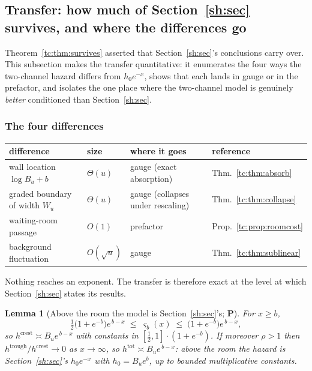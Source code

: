 \documentclass[11pt]{article}
\numberwithin{equation}{section}
\theoremstyle{plain}
\newtheorem{lemma}[theorem]{Lemma}
\theoremstyle{definition}
\theoremstyle{remark}
\begin{document}
\subsection{Transfer: how much of Section~\ref{sh:sec} survives, and where the
differences go}\label{tc:sub:transfer}

Theorem~\ref{tc:thm:survives} asserted that Section~\ref{sh:sec}'s conclusions
carry over. This subsection makes the transfer quantitative: it
enumerates the four ways the two-channel hazard differs from
$h_{0}e^{-x}$, shows that each lands in gauge or in the prefactor, and
isolates the one place where the two-channel model is genuinely
\emph{better} conditioned than Section~\ref{sh:sec}.

\subsubsection{The four differences}\label{tc:subsub:four}

\begin{center}\small
\begin{tabular}{@{}llll@{}}
\toprule
difference & size & where it goes & reference\\
\midrule
wall location $\log B_u+b$ & $\Theta(u)$ & gauge (exact absorption) &
Thm.~\ref{tc:thm:absorb}\\
graded boundary of width $W_u$ & $\Theta(u)$ & gauge (collapses under
rescaling) & Thm.~\ref{tc:thm:collapse}\\
waiting-room passage & $O(1)$ & prefactor & Prop.~\ref{tc:prop:roomcost}\\
background fluctuation & $O(\sqrt u)$ & gauge &
Thm.~\ref{tc:thm:sublinear}\\
\bottomrule
\end{tabular}
\end{center}

\noindent Nothing reaches an exponent. The transfer is therefore exact
at the level at which Section~\ref{sh:sec} states its results.

\begin{lemma}[Above the room the model is Section~\ref{sh:sec}'s; \textbf{P}]
\label{tc:lem:aboveroom}
For $x\ge b$,
\begin{equation}\label{tc:eq:sandwich}
\tfrac12\bigl(1+e^{-b}\bigr)e^{\,b-x}\;\le\;\varsigma_b(x)\;\le\;
\bigl(1+e^{-b}\bigr)e^{\,b-x},
\end{equation}
so $h^{\mathrm{crest}}\asymp B_ue^{\,b-x}$ with constants in
$[\tfrac12,1]\cdot(1+e^{-b})$. If moreover $\rho>1$ then
$h^{\mathrm{trough}}/h^{\mathrm{crest}}\to0$ as $x\to\infty$, so
$h^{\mathrm{tot}}\asymp B_ue^{\,b-x}$: above the room the hazard is
Section~\ref{sh:sec}'s $h_{0}e^{-x}$ with $h_{0}=B_ue^{b}$, up to bounded
multiplicative constants.
\end{lemma}
\end{document}

